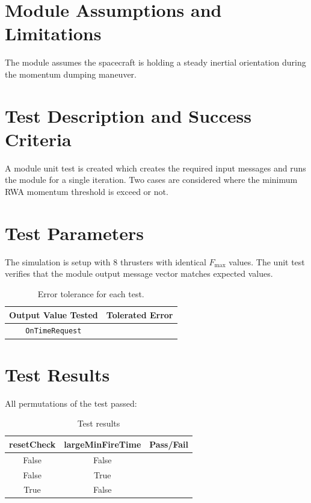\documentclass[]{BasiliskReportMemo}
\begin{document}
\section{Module Assumptions and Limitations}
The module assumes the spacecraft is holding a steady inertial orientation during the momentum dumping maneuver.










\section{Test Description and Success Criteria}
A module unit test is created which creates the required input messages and runs the module for a single iteration.  Two cases are considered where the minimum RWA momentum threshold is exceed or not.




\section{Test Parameters}
The simulation is setup with 8 thrusters  with identical $F_{\text{max}}$ values.
The unit test verifies that the module output  message vector matches expected values.
\begin{table}[htbp]
	\caption{Error tolerance for each test.}
	\label{tab:errortol}
	\centering \fontsize{10}{10}\selectfont
	\begin{tabular}{ c | c } %
		\hline\hline
		\textbf{Output Value Tested}  & \textbf{Tolerated Error}  \\
		\hline
		{\tt OnTimeRequest}        & 	   \\
		\hline\hline
	\end{tabular}
\end{table}




\section{Test Results}
All permutations of the test passed:
\begin{table}[h]
	\caption{Test results}
	\label{tab:results}
	\centering \fontsize{10}{10}\selectfont
	\begin{tabular}{c | c | c  } %
		\hline\hline
		\textbf{resetCheck} & \textbf{largeMinFireTime}	&\textbf{Pass/Fail} \\
		\hline
	   False & 	  False 			&  \\
	   False & True	   			&  \\
	   True & False 	   			&  \\
	   \hline\hline
	\end{tabular}
\end{table}
\end{document}
